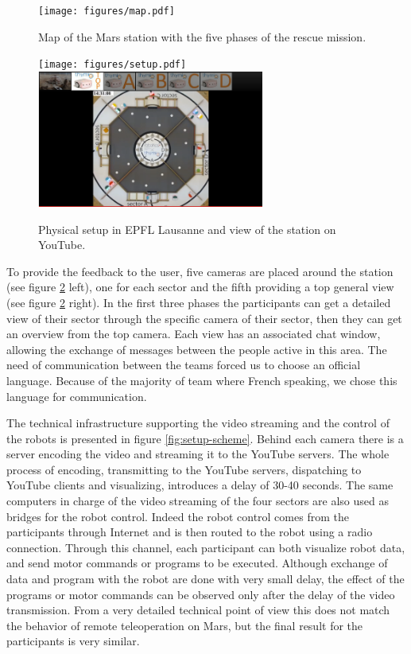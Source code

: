 \documentclass{intech-journal}
\begin{document}
\begin{figure}[ht]
 \centering
    \texttt{[image: figures/map.pdf]}
  \caption{Map of the Mars station with the five phases of the rescue mission.}
  \label{fig:map} 
\end{figure}

\begin{figure}[ht]
 \centering
    \texttt{[image: figures/setup.pdf]}
    \includegraphics[height=45mm]{figures/youtube-view.png}
  \caption{Physical setup in EPFL Lausanne and view of the station on YouTube.}
  \label{fig:setup-physical} 
\end{figure}

To provide the feedback to the user, five cameras are placed around the station (see figure \ref{fig:setup-physical} left), one for each sector and the fifth providing a top general view (see figure \ref{fig:setup-physical} right).
In the first three phases the participants can get a detailed view of their sector through the specific camera of their sector, then they can get an overview from the top camera.
Each view has an associated chat window, allowing the exchange of messages between the people active in this area.
The need of communication between the teams forced us to choose an official language. 
Because of the majority of team where French speaking, we chose this language for communication.

The technical infrastructure supporting the video streaming and the control of the robots is presented in figure \ref{fig:setup-scheme}.
Behind each camera there is a server encoding the video and streaming it to the YouTube servers. 
The whole process of encoding, transmitting to the YouTube servers, dispatching to YouTube clients and visualizing, introduces a delay of 30-40 seconds.
The same computers in charge of the video streaming of the four sectors are also used as bridges for the robot control. 
Indeed the robot control comes from the participants through Internet and is then routed to the robot using a radio connection. 
Through this channel, each participant can both visualize robot data, and send motor commands or programs to be executed. 
Although exchange of data and program with the robot are done with very small delay, the effect of the programs or motor commands can be observed only after the delay of the video transmission. 
From a very detailed technical point of view this does not match the behavior of remote teleoperation on Mars, but the final result for the participants is very similar.
\end{document}
